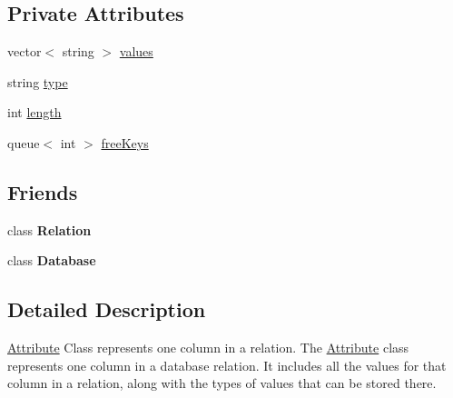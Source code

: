 \subsection*{Private Attributes}
\begin{DoxyCompactItemize}
\item 
vector$<$ string $>$ \hyperlink{class_attribute_ae3eb3292f5ddc91f6c2c0152edf625fb}{values}
\item 
string \hyperlink{class_attribute_abc17bc58ec6c45b21533ee2194bf2516}{type}
\item 
int \hyperlink{class_attribute_ace310d0f9b59ecde4923c401852112d0}{length}
\item 
queue$<$ int $>$ \hyperlink{class_attribute_a0b0da13208f7c429f72e766c977f9e40}{free\-Keys}
\end{DoxyCompactItemize}
\subsection*{Friends}
\begin{DoxyCompactItemize}
\item 
\hypertarget{class_attribute_a7ee004262f27f8c916688911a71e3aa1}{class {\bfseries Relation}}\label{class_attribute_a7ee004262f27f8c916688911a71e3aa1}

\item 
\hypertarget{class_attribute_a6efef52d7a939622bbc934ff6b90ffe0}{class {\bfseries Database}}\label{class_attribute_a6efef52d7a939622bbc934ff6b90ffe0}

\end{DoxyCompactItemize}


\subsection{Detailed Description}
\hyperlink{class_attribute}{Attribute} Class represents one column in a relation. The \hyperlink{class_attribute}{Attribute} class represents one column in a database relation. It includes all the values for that column in a relation, along with the types of values that can be stored there. 

